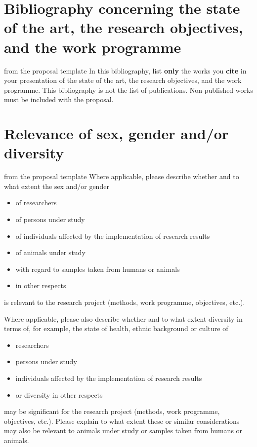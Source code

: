 \documentclass[    %
    gitinfo,       %
    noworkareas,   %
    RAM,           %
    general,       %
    \classoptions] %
    {dfgproposal}
\begin{document}
\begin{proposal}



\section{Bibliography concerning the state of the art, the research objectives, and the
  work programme }

\begin{todo}{from the proposal template}
  In this bibliography, list \textbf{only} the works you \textbf{cite} in your presentation of the state of
  the art, the research objectives, and the work programme. This bibliography is not the
  list of publications. Non-published works must be included with the proposal.
\end{todo}
\printbibliography[heading=empty]
\ifpublic\else

\section{Relevance of sex, gender and/or diversity}

\begin{todo}{from the proposal template}
	Where applicable, please describe whether and to what extent the sex and/or gender
	\begin{itemize}
		\item of researchers
		\item of persons under study
		\item of individuals affected by the implementation of research results
		\item of animals under study
		\item with regard to samples taken from humans or animals
		\item in other respects
	\end{itemize}
	is relevant to the research project (methods, work programme, objectives, etc.).
	
	Where applicable, please also describe whether and to what extent diversity in terms of, for example, the state of health, ethnic background or culture of
	\begin{itemize}
		\item researchers
		\item persons under study
		\item individuals affected by the implementation of research results
		\item or diversity in other respects
	\end{itemize}
	may be significant for the research project (methods, work programme, objectives, etc.). Please explain to what extent these or similar considerations may also be relevant to animals under study or samples taken from humans or animals.
	

\end{todo}
\end{proposal}
\end{document}
